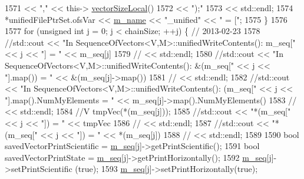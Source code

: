 \begin{DoxyCode}
1571                                         << \textcolor{stringliteral}{","}                                 << this->
      \hyperlink{class_q_u_e_s_o_1_1_base_vector_sequence_a2fefedf9e5b90f22881103b3f92555f6}{vectorSizeLocal}()
1572                                         << \textcolor{stringliteral}{");"}
1573                                         << std::endl;
1574               *unifiedFilePtrSet.ofsVar << \hyperlink{class_q_u_e_s_o_1_1_base_vector_sequence_a3c379b2f7c20a2a1dd083ea43fca1494}{m\_name} << \textcolor{stringliteral}{"\_unified"} << \textcolor{stringliteral}{" = ["};
1575             \}
1576 
1577             \textcolor{keywordflow}{for} (\textcolor{keywordtype}{unsigned} \textcolor{keywordtype}{int} j = 0; j < chainSize; ++j) \{ \textcolor{comment}{// 2013-02-23}
1578         \textcolor{comment}{//std::cout << "In SequenceOfVectors<V,M>::unifiedWriteContents(): m\_seq[" << j << "] = " <<
       m\_seq[j]}
1579               \textcolor{comment}{//          << std::endl;}
1580             \textcolor{comment}{//std::cout << "In SequenceOfVectors<V,M>::unifiedWriteContents(): &(m\_seq[" << j << "].map())
       = " << &(m\_seq[j]->map())}
1581               \textcolor{comment}{//          << std::endl;}
1582               \textcolor{comment}{//std::cout << "In SequenceOfVectors<V,M>::unifiedWriteContents(): (m\_seq[" << j <<
       "].map().NumMyElements = " << m\_seq[j]->map().NumMyElements()}
1583               \textcolor{comment}{//          << std::endl;}
1584               \textcolor{comment}{//V tmpVec(*(m\_seq[j]));}
1585         \textcolor{comment}{//std::cout << "*(m\_seq[" << j << "]) = " << tmpVec}
1586               \textcolor{comment}{//          << std::endl;}
1587         \textcolor{comment}{//std::cout << "*(m\_seq[" << j << "]) = " << *(m\_seq[j])}
1588               \textcolor{comment}{//          << std::endl;}
1589 
1590               \textcolor{keywordtype}{bool} savedVectorPrintScientific = \hyperlink{class_q_u_e_s_o_1_1_sequence_of_vectors_ae83e7c53439265667809256d0d302e5b}{m\_seq}[j]->getPrintScientific();
1591               \textcolor{keywordtype}{bool} savedVectorPrintState      = \hyperlink{class_q_u_e_s_o_1_1_sequence_of_vectors_ae83e7c53439265667809256d0d302e5b}{m\_seq}[j]->getPrintHorizontally();
1592               \hyperlink{class_q_u_e_s_o_1_1_sequence_of_vectors_ae83e7c53439265667809256d0d302e5b}{m\_seq}[j]->setPrintScientific  (\textcolor{keyword}{true});
1593               \hyperlink{class_q_u_e_s_o_1_1_sequence_of_vectors_ae83e7c53439265667809256d0d302e5b}{m\_seq}[j]->setPrintHorizontally(\textcolor{keyword}{true});

\end{DoxyCode}
